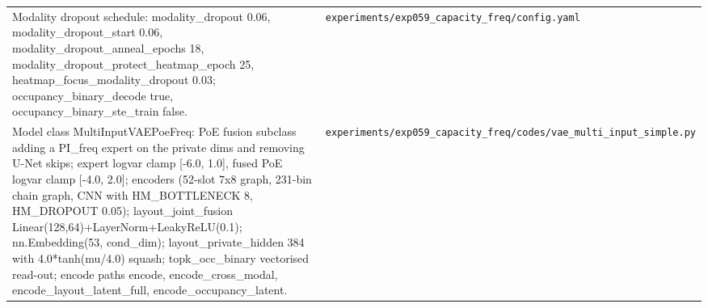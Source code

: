 \begin{longtable}{p{} p{}}
Modality dropout schedule: modality\_dropout 0.06, modality\_dropout\_start 0.06, modality\_dropout\_anneal\_epochs 18, modality\_dropout\_protect\_heatmap\_epoch 25, heatmap\_focus\_modality\_dropout 0.03; occupancy\_binary\_decode true, occupancy\_binary\_ste\_train false. & \texttt{experiments/\allowbreak{}exp059\_\allowbreak{}capacity\_\allowbreak{}freq/\allowbreak{}config.yaml} \\
Model class MultiInputVAEPoeFreq: PoE fusion subclass adding a PI\_freq expert on the private dims and removing U-Net skips; expert logvar clamp [-6.0, 1.0], fused PoE logvar clamp [-4.0, 2.0]; encoders (52-slot 7x8 graph, 231-bin chain graph, CNN with HM\_BOTTLENECK 8, HM\_DROPOUT 0.05); layout\_joint\_fusion Linear(128,64)+LayerNorm+LeakyReLU(0.1); nn.Embedding(53, cond\_dim); layout\_private\_hidden 384 with 4.0*tanh(mu/4.0) squash; topk\_occ\_binary vectorised read-out; encode paths encode, encode\_cross\_modal, encode\_layout\_latent\_full, encode\_occupancy\_latent. & \texttt{experiments/\allowbreak{}exp059\_\allowbreak{}capacity\_\allowbreak{}freq/\allowbreak{}codes/\allowbreak{}vae\_\allowbreak{}multi\_\allowbreak{}input\_\allowbreak{}simple.py} \\
\hline
\end{longtable}
\endgroup

